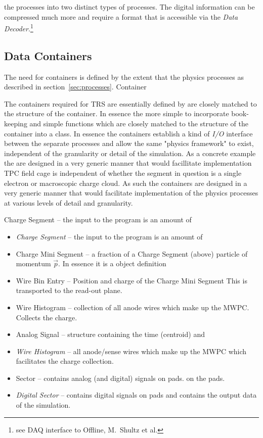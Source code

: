 \documentclass[twoside]{article}
\newcommand{\name}[1]{\textsf{#1}}%
\begin{document}
the processes into two distinct types of processes.  The digital information
can be compressed much more and require a format that is accessible
via the {\em Data Decoder}.\footnote{see DAQ interface to Offline, M.~Shultz et al.}

\subsection{Data Containers}
The need for containers is defined by the extent that the physics
processes as described in section~\ref{sec:processes}.  Container

The containers required for \name{TRS} are essentially defined by 
are closely matched to the structure of the container.  In essence the
more simple to incorporate book-keeping and simple functions which
are closely matched to the structure of the container into a class.  
In essence the
containers establish a kind of {\em I/O} interface between the separate
processes and allow the same "physics framework" to exist, independent of
the granularity or detail of the simulation.  As a concrete example the
are designed in a very generic manner that would facillitate implementation
TPC field cage is independent of whether the segment in question is
a single electron or macroscopic charge cloud.  As such the containers
are designed in a very generic manner that would facilitate implementation
of the physics processes at various levels of detail and granularity.
   \item Charge Segment -- the input to the program is an amount of

\begin{itemize}
   \item {\em Charge Segment} -- the input to the program is an amount of
   \item Charge Mini Segment -- a fraction of a Charge Segment (above) 
     particle of momentum $\vec{p}$.  In essence it is a object definition
   \item Wire Bin Entry -- Position and charge of the Charge Mini Segment
     This is transported to the read-out plane.
   \item Wire Histogram -- collection of all anode wires which make
     up the MWPC.  Collects the charge.
   \item Analog Signal -- structure containing the time (centroid) and 
   \item {\em Wire Histogram} -- all anode/sense wires which make
     up the MWPC which facilitates the charge collection.
   \item Sector -- contains analog (and digital) signals on pads.
     on the pads.
   \item {\em Digital Sector} -- contains digital signals on pads and contains the
     output data of the simulation.     
\end{itemize}
\end{document}
